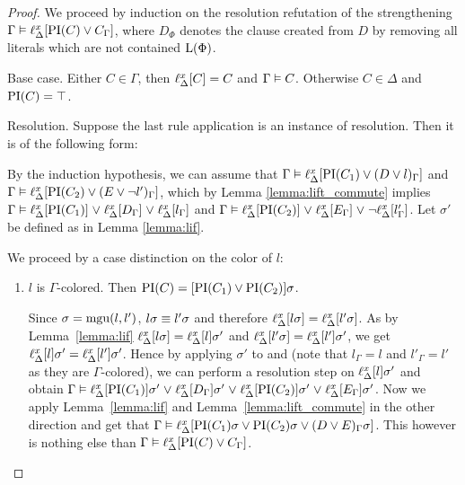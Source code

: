 \begin{proof}
	We proceed by induction on the resolution refutation of the strengthening $\Gamma \entails \lifdelta{\PI(C) \lor\nolinebreak C_\Gamma}$,
	where $D_\Phi$ denotes the clause created from $D$ by removing all literals which are not contained $\operatorname{L}(\Phi)$.

	\begin{description}
		\item{Base case.}
			Either $C \in \Gamma$, then $\ell_{\Delta}^{x}[C] = C$ and $\Gamma \vDash C$.
			Otherwise $C \in \Delta$ and $\operatorname{PI}(C) = \top$.

		\item{Resolution.}
			Suppose the last rule application is an instance of resolution. Then it is of the following form:
			\begin{prooftree}
			\end{prooftree}

			By the induction hypothesis, we can assume that
			$\Gamma \vDash \ell_{\Delta}^{x}[\operatorname{PI}(C_1) \lor (D\lor l)_\Gamma]$ and $\Gamma \vDash \ell_{\Delta}^{x}[\operatorname{PI}(C_2) \lor (E\lor \lnot l')_\Gamma]$,
			which by Lemma \ref{lemma:lift_commute} implies 
			\markA{} $\Gamma \vDash \ell_{\Delta}^{x}[\operatorname{PI}(C_1)] \;{\lor}\;\allowbreak \ell_{\Delta}^{x}[D_\Gamma] \;{\lor}\;\allowbreak \ell_{\Delta}^{x}[l_\Gamma]$ and \markB{} $\Gamma \vDash \ell_{\Delta}^{x}[\operatorname{PI}(C_2)] \;{\lor}\; \ell_{\Delta}^{x}[E_\Gamma] \;{\lor}\; \lnot \ell_{\Delta}^{x}[l'_\Gamma]$.
			Let $\sigma'$ be defined as in Lemma \ref{lemma:lif}.

			We proceed by a case distinction on the color of $l$:
			\begin{enumerate}
				\item $l$ is $\Gamma$-colored. Then $\operatorname{PI}(C) = [\operatorname{PI}(C_1\label{aou5jklah}) \lor \operatorname{PI}(C_2)]\sigma$.
					\label{aou5jklah}

					Since $\sigma = \operatorname{mgu}(l, l')$, $l\sigma \equiv l'\sigma$ and therefore $\ell_{\Delta}^{x}[l\sigma] = \ell_{\Delta}^{x}[l'\sigma]$.
					As by Lemma~\ref{lemma:lif} $\ell_{\Delta}^{x}[l\sigma] = \ell_{\Delta}^{x}[l]\sigma'$ and $\ell_{\Delta}^{x}[l'\sigma] = \ell_{\Delta}^{x}[l']\sigma'$,
					we get $\ell_{\Delta}^{x}[l]\sigma' = \ell_{\Delta}^{x}[l']\sigma'$.
					Hence by applying $\sigma'$ to \markA{} and \markB{} (note that $l_\Gamma = l$ and $l'_\Gamma = l'$ as they are $\Gamma$-colored), we can perform a resolution step on $\ell_{\Delta}^{x}[l]\sigma'$ and obtain
					$\Gamma \vDash \ell_{\Delta}^{x}[\operatorname{PI}(C_1)]\sigma' \;{\lor}\; \ell_{\Delta}^{x}[D_\Gamma] \sigma' \;{\lor}\; \ell_{\Delta}^{x}[\operatorname{PI}(C_2)]\sigma' \;{\lor}\; \ell_{\Delta}^{x}[E_\Gamma] \sigma'$.
					Now we apply Lemma~\ref{lemma:lif} and Lemma~\ref{lemma:lift_commute} in the other direction 
					and get that 
					$\Gamma \vDash \ell_{\Delta}^{x}[\operatorname{PI}(C_1)\sigma \lor \operatorname{PI}(C_2)\sigma \lor\allowbreak (D \lor E)_\Gamma \sigma]$.
					This however is nothing else than 
					$\Gamma \vDash \ell_{\Delta}^{x}[\operatorname{PI}(C) \lor C_\Gamma]$.


\end{enumerate}
\end{description}
\end{proof}
